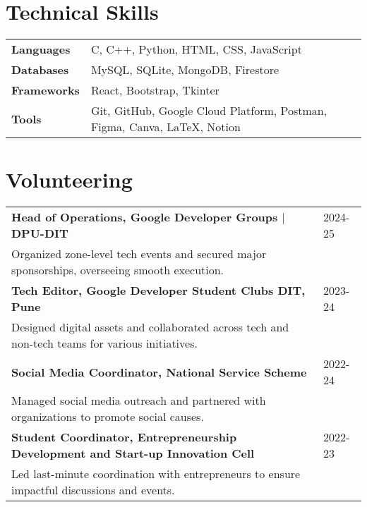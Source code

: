 \documentclass[a4paper,10pt]{article}
\begin{document}
\section{Technical Skills}
\begin{tabularx}{\linewidth}{@{}l X@{}}
\textbf{Languages} &  \normalsize{C, C++, Python, HTML, CSS, JavaScript}\\
\textbf{Databases} &  \normalsize{MySQL, SQLite, MongoDB, Firestore}\\
\textbf{Frameworks}  &  \normalsize{React, Bootstrap, Tkinter}\\
\textbf{Tools}  &  \normalsize{Git, GitHub, Google Cloud Platform, Postman, Figma, Canva, LaTeX, Notion}\\
\end{tabularx}

\section{Volunteering}

\begin{tabularx}{\linewidth}{@{}l X@{}}	

\textbf{Head of Operations, Google Developer Groups $|$ DPU-DIT} & \hfill 
2024-25 \\ \vspace*{1mm}
Organized zone-level tech events and secured major sponsorships, overseeing smooth execution. \\

\textbf{Tech Editor, Google Developer Student Clubs DIT, Pune} & \hfill 
2023-24 \\ \vspace*{1mm}
Designed digital assets and collaborated across tech and non-tech teams for various initiatives. \\

\textbf{Social Media Coordinator, National Service Scheme} & \hfill 
2022-24 \\ \vspace*{1mm}
Managed social media outreach and partnered with organizations to promote social causes. \\ 

\textbf{Student Coordinator, Entrepreneurship Development and Start-up Innovation Cell} & \hfill 
2022-23 \\ \vspace*{1mm}
Led last-minute coordination with entrepreneurs to ensure impactful discussions and events. \\ 

\end{tabularx}
\end{document}
